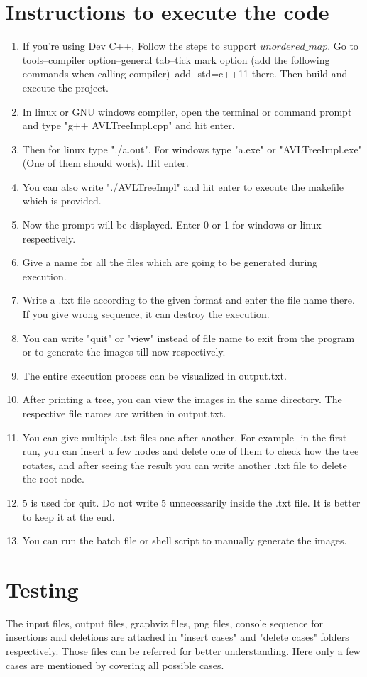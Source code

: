 \documentclass{article}
\begin{document}
\section{Instructions to execute the code}
\begin{enumerate}
	\item If you're using Dev C++, Follow the steps to support $unordered\_map$. Go to tools--compiler option--general tab--tick mark option (add the following commands when calling compiler)--add -std=c++11 there. Then build and execute the project.
	\item In linux or GNU windows compiler, open the terminal or command prompt and type "g++ AVLTreeImpl.cpp" and hit enter.
	\item Then for linux type "./a.out". For windows type "a.exe" or "AVLTreeImpl.exe" (One of them should work). Hit enter.
	\item You can also write "./AVLTreeImpl" and hit enter to execute the makefile which is provided.
	\item Now the prompt will be displayed. Enter 0 or 1 for windows or linux respectively.
	\item Give a name for all the files which are going to be generated during execution.
	\item Write a .txt file according to the given format and enter the file name there. If you give wrong sequence, it can destroy the execution.
	\item You can write "quit" or "view" instead of file name to exit from the program or to generate the images till now respectively.
	\item The entire execution process can be visualized in output.txt.
	\item After printing a tree, you can view the images in the same directory. The respective file names are written in output.txt.
	\item You can give multiple .txt files one after another. For example- in the first run, you can insert a few nodes and delete one of them to check how the tree rotates, and after seeing the result you can write another .txt file to delete the root node.
	\item $5$ is used for quit. Do not write $5$ unnecessarily inside the .txt file. It is better to keep it at the end.
	\item You can run the batch file or shell script to manually generate the images.
\end{enumerate}

\section{Testing}
The input files, output files, graphviz files, png files, console sequence for insertions and deletions are attached in "insert cases" and "delete cases" folders respectively. Those files can be referred for better understanding. Here only a few cases are mentioned by covering all possible cases.
\end{document}

